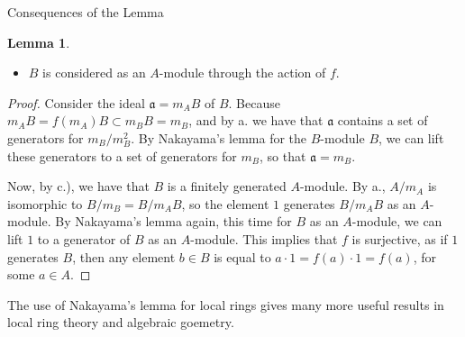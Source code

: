 \documentclass[12pt]{article}
\theoremstyle{definition}
\newtheorem{lemma}[definition]{Lemma}
\begin{document}
\begin{section}{Consequences of the Lemma}
\begin{lemma}
\begin{itemize}
		\item $B$ is considered as an $A$-module through the action of $f$.
		\end{itemize}
			\label{hart}
			\begin{proof}
				Consider the ideal $\mathfrak a = m_AB$ of $B$. Because $m_AB = f(m_A)B \subset m_B B = m_B$, and by a. we have that $\mathfrak a$ contains a set of generators for $m_B/m_B^2$. By Nakayama's lemma for the $B$-module $B$, we can lift these generators to a set of generators for $m_B$, so that $\mathfrak a = m_B$.
			\par Now, by c.), we have that $B$ is a finitely generated $A$-module. By a., $A/m_A$ is isomorphic to $B/m_B = B/m_AB$, so the element $1$ generates $B/m_AB$ as an $A$-module. By Nakayama's lemma again, this time for $B$ as an $A$-module, we can lift $1$ to a generator of $B$ as an $A$-module. This implies that $f$ is surjective, as if $1$ generates $B$, then any element $b \in B$ is equal to $a \cdot 1 = f(a)\cdot 1 = f(a)$, for some $a \in A$.
			\end{proof}
		\end{lemma}
		The use of Nakayama's lemma for local rings gives many more useful results in local ring theory and algebraic goemetry. 
\end{section}
\theendnotes
\begin{thebibliography}{}
\end{thebibliography}
\end{document}
